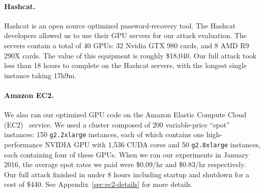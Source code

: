 \paragraph{Hashcat.}
Hashcat\cite{hashcat} is an open source optimized password-recovery tool.
The Hashcat developers allowed us to use their GPU servers for our attack evaluation. 
The servers contain a total of 40 GPUs: 32 Nvidia GTX 980 cards, and 8 AMD R9 290X cards.
The value of this equipment is roughly \$18,040.
Our full attack took less than 18 hours to complete on the Hashcat servers, with the longest single instance taking 17h9m.


\paragraph{Amazon EC2.}
\label{sec:ec2_results}
\iftrue
We also ran our optimized GPU code on the Amazon Elastic Compute Cloud (EC2)~\cite{ec2} service.  We used a cluster composed of 200 variable-price ``spot'' instances: 150 \texttt{g2.2xlarge} instances, each of which contains one high-performance NVIDIA GPU with 1,536 CUDA cores and 50 \texttt{g2.8xlarge} instances, each containing four of these GPUs.  
When we ran our experiments in January 2016, the average spot rates we paid were \$0.09/hr and \$0.83/hr respectively.  
Our full attack finished in under 8 hours including startup and shutdown for a cost of \$440.  
See Appendix~\ref{sec:ec2-details} for more details.
\else

\fi
